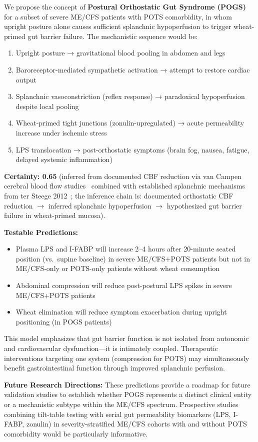 \begin{speculation}
\label{spec:postural-gut-syndrome}
We propose the concept of \textbf{Postural Orthostatic Gut Syndrome (POGS)} for a subset of severe ME/CFS patients with POTS comorbidity, in whom upright posture alone causes sufficient splanchnic hypoperfusion to trigger wheat-primed gut barrier failure. The mechanistic sequence would be:

\begin{enumerate}
    \item Upright posture → gravitational blood pooling in abdomen and legs
    \item Baroreceptor-mediated sympathetic activation → attempt to restore cardiac output
    \item Splanchnic vasoconstriction (reflex response) → paradoxical hypoperfusion despite local pooling
    \item Wheat-primed tight junctions (zonulin-upregulated) → acute permeability increase under ischemic stress
    \item LPS translocation → post-orthostatic symptoms (brain fog, nausea, fatigue, delayed systemic inflammation)
\end{enumerate}

\textbf{Certainty: 0.65} (inferred from documented CBF reduction via van Campen cerebral blood flow studies~\cite{VanCampenEtAl2020,VanCampenEtAl2024} combined with established splanchnic mechanisms from ter Steege 2012~\cite{terSteege2012}; the inference chain is: documented orthostatic CBF reduction $\rightarrow$ inferred splanchnic hypoperfusion $\rightarrow$ hypothesized gut barrier failure in wheat-primed mucosa).

\textbf{Testable Predictions:}
\begin{itemize}
    \item Plasma LPS and I-FABP will increase 2--4 hours after 20-minute seated position (vs.\ supine baseline) in severe ME/CFS+POTS patients but not in ME/CFS-only or POTS-only patients without wheat consumption
    \item Abdominal compression will reduce post-postural LPS spikes in severe ME/CFS+POTS patients
    \item Wheat elimination will reduce symptom exacerbation during upright positioning (in POGS patients)
\end{itemize}

This model emphasizes that gut barrier function is not isolated from autonomic and cardiovascular dysfunction---it is intimately coupled. Therapeutic interventions targeting one system (compression for POTS) may simultaneously benefit gastrointestinal function through improved splanchnic perfusion.

\textbf{Future Research Directions:} These predictions provide a roadmap for future validation studies to establish whether POGS represents a distinct clinical entity or a mechanistic subtype within the ME/CFS spectrum. Prospective studies combining tilt-table testing with serial gut permeability biomarkers (LPS, I-FABP, zonulin) in severity-stratified ME/CFS cohorts with and without POTS comorbidity would be particularly informative.
\end{speculation}

